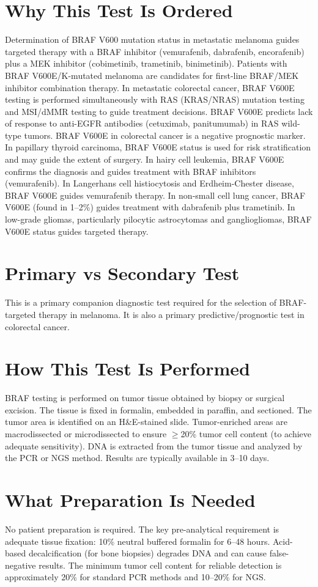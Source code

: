 \section*{Why This Test Is Ordered}
Determination of BRAF V600 mutation status in metastatic melanoma guides targeted therapy with a BRAF inhibitor (vemurafenib, dabrafenib, encorafenib) plus a MEK inhibitor (cobimetinib, trametinib, binimetinib). Patients with BRAF V600E/K-mutated melanoma are candidates for first-line BRAF/MEK inhibitor combination therapy. In metastatic colorectal cancer, BRAF V600E testing is performed simultaneously with RAS (KRAS/NRAS) mutation testing and MSI/dMMR testing to guide treatment decisions. BRAF V600E predicts lack of response to anti-EGFR antibodies (cetuximab, panitumumab) in RAS wild-type tumors. BRAF V600E in colorectal cancer is a negative prognostic marker. In papillary thyroid carcinoma, BRAF V600E status is used for risk stratification and may guide the extent of surgery. In hairy cell leukemia, BRAF V600E confirms the diagnosis and guides treatment with BRAF inhibitors (vemurafenib). In Langerhans cell histiocytosis and Erdheim-Chester disease, BRAF V600E guides vemurafenib therapy. In non-small cell lung cancer, BRAF V600E (found in 1--2\%) guides treatment with dabrafenib plus trametinib. In low-grade gliomas, particularly pilocytic astrocytomas and gangliogliomas, BRAF V600E status guides targeted therapy.

\section*{Primary vs Secondary Test}
This is a primary companion diagnostic test required for the selection of BRAF-targeted therapy in melanoma. It is also a primary predictive/prognostic test in colorectal cancer.

\section*{How This Test Is Performed}
BRAF testing is performed on tumor tissue obtained by biopsy or surgical excision. The tissue is fixed in formalin, embedded in paraffin, and sectioned. The tumor area is identified on an H\&E-stained slide. Tumor-enriched areas are macrodissected or microdissected to ensure $\geq$20\% tumor cell content (to achieve adequate sensitivity). DNA is extracted from the tumor tissue and analyzed by the PCR or NGS method. Results are typically available in 3--10 days.

\section*{What Preparation Is Needed}
No patient preparation is required. The key pre-analytical requirement is adequate tissue fixation: 10\% neutral buffered formalin for 6--48 hours. Acid-based decalcification (for bone biopsies) degrades DNA and can cause false-negative results. The minimum tumor cell content for reliable detection is approximately 20\% for standard PCR methods and 10--20\% for NGS.

